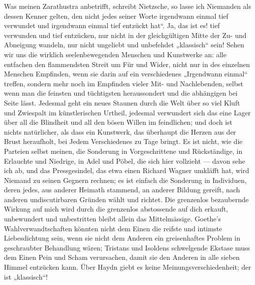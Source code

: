 Was meinen Zarathustra anbetrifft, schreibt Nietzsche, so lasse ich Niemanden als dessen Kenner gelten, den nicht jedes seiner Worte irgendwann einmal tief verwundet und irgendwann einmal tief entzückt hat“. Ja, das ist es! tief verwunden und tief entzücken, nur nicht in der gleichgültigen Mitte der Zu- und Abneigung wandeln, nur nicht ungeliebt und unbefehdet „klassisch“ sein! Sehen wir uns die wirklich seelenbewegenden Menschen und Kunstwerke an: alle entfachen den flammendsten Streit um Für und Wider, nicht nur in des einzelnen Menschen Empfinden, wenn sie darin auf ein verschiedenes „Irgendwann einmal“ treffen, sondern mehr noch im Empfinden vieler Mit- und Nachlebenden, selbst wenn man die feinsten und tüchtigsten heraussondert und die abhängigen bei Seite lässt. Jedesmal geht ein neues Staunen durch die Welt über so viel Kluft und Zwiespalt im künstlerischen Urtheil, jedesmal verwundert sich das eine Lager über all die Blindheit und all den bösen Willen im feindlichen; und doch ist nichts natürlicher, als dass ein Kunstwerk, das überhaupt die Herzen aus der Brust heraufholt, bei Jedem Verschiedenes zu Tage bringt. Es ist nicht, wie die Parteien selbst meinen, die Sonderung in Vorgeschrittene und Rückständige, in Erlauchte und Niedrige, in Adel und Pöbel, die sich hier vollzieht — davon sehe ich ab, und das Pressgesindel, das etwa einen Richard Wagner umkläfft hat, wird Niemand zu seinen Gegnern rechnen; es ist einfach die Sonderung in Individuen, deren jedes, aus anderer Heimath stammend, an anderer Bildung gereift, nach anderen undiscutirbaren Gründen wählt und richtet. Die grenzenlos bezaubernde Wirkung auf mich wird durch die grenzenlos abstossende auf dich erkauft, unbewundert und unbestritten bleibt allein das Mittelmässige. Goethe’s Wahlverwandtschaften könnten nicht dem Einen die reifste und intimste Liebesdichtung sein, wenn sie nicht dem Anderen ein greisenhaftes Problem in geschraubter Behandlung wären; Tristans und Isoldens schwelgende Ekstase muss dem Einen Pein und Scham verursachen, damit sie den Anderen in alle sieben Himmel entzücken kann. Über Haydn giebt es keine Meinungsverschiedenheit; der ist „klassisch“!
\par

